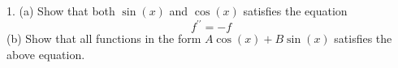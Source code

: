 1. (a) Show that both $\sin(x)$ and $\cos(x)$ satisfies the equation
$$f^{\prime\prime}=-f$$
(b) Show that all functions in the form $A\cos(x)+B\sin(x)$ satisfies the above equation.